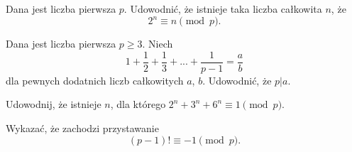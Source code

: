 \begin{problem}{1} 
	Dana jest liczba pierwsza $p$. Udowodnić, że istnieje taka liczba całkowita $n$, że 
	\[
		2^n \equiv n \pmod{p}.
	\]
\end{problem}

\begin{problem}{2}
	Dana jest liczba pierwsza $p\geqslant 3$. Niech 
	\[
		1 + \frac{1}{2} + \frac{1}{3} + ... + \frac{1}{p-1} = \frac{a}{b}
	\]
	dla pewnych dodatnich liczb całkowitych $a$, $b$.
	Udowodnić, że $p\big| a$.
\end{problem}

\begin{problem}{3}
	Udowodnij, że istnieje $n$, dla którego $2^n+3^n+6^n\equiv 1 \pmod{p}.$
\end{problem}

\begin{problem}{4}
	Wykazać, że zachodzi przystawanie
	\[
		(p - 1)! \equiv -1 \pmod{p}.
	\]
\end{problem}